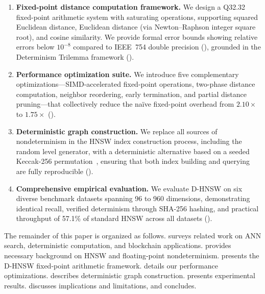 \documentclass[10pt,journal,compsoc]{IEEEtran}
\newcommand{\dhnsw}{\textsc{D-HNSW}}
\newcommand{\hnsw}{\textsc{HNSW}}
\begin{document}
\begin{enumerate}[leftmargin=*]
  \item \textbf{Fixed-point distance computation framework.} We design a Q32.32 fixed-point arithmetic system with saturating operations, supporting squared Euclidean distance, Euclidean distance (via Newton--Raphson integer square root), and cosine similarity. We provide formal error bounds showing relative errors below $10^{-8}$ compared to IEEE~754 double precision (), grounded in the Determinism Trilemma framework ().

  \item \textbf{Performance optimization suite.} We introduce five complementary optimizations---SIMD-accelerated fixed-point operations, two-phase distance computation, neighbor reordering, early termination, and partial distance pruning---that collectively reduce the na\"ive fixed-point overhead from $2.10\times$ to $1.75\times$ ().

  \item \textbf{Deterministic graph construction.} We replace all sources of nondeterminism in the \hnsw{} index construction process, including the random level generator, with a deterministic alternative based on a seeded Keccak-256 permutation~\cite{bertoni2013keccak}, ensuring that both index building and querying are fully reproducible ().

  \item \textbf{Comprehensive empirical evaluation.} We evaluate \dhnsw{} on six diverse benchmark datasets spanning 96 to 960 dimensions, demonstrating identical recall, verified determinism through SHA-256 hashing, and practical throughput of 57.1\% of standard \hnsw{} across all datasets ().
\end{enumerate}

The remainder of this paper is organized as follows.  surveys related work on ANN search, deterministic computation, and blockchain applications.  provides necessary background on \hnsw{} and floating-point nondeterminism.  presents the \dhnsw{} fixed-point arithmetic framework.  details our performance optimizations.  describes deterministic graph construction.  presents experimental results.  discusses implications and limitations, and  concludes.
\end{document}
